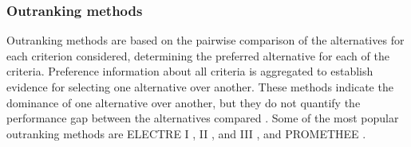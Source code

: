 \begin{refsection}[referencesCh1]

\subsubsection{Outranking methods}
Outranking methods are based on the pairwise comparison of the alternatives for each criterion considered, determining the preferred alternative for each of the criteria. Preference information about all criteria is aggregated to establish evidence for selecting one alternative over another. These methods indicate the dominance of one alternative over another, but they do not quantify the performance gap between the alternatives compared \citep{giove2009decision}. Some of the most popular outranking methods are ELECTRE I \citep{roy1968classement}, II \citep{roy1973methode}, and III \citep{roy1978electre}, and PROMETHEE \citep{vincke1985preference}.


\end{refsection}
